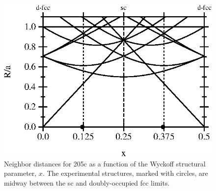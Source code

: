 \documentclass[preprint]{revtex4}              %
\begin{document}
\begin{figure}
\begin{center}
\includegraphics{205c.eps}
\end{center}
\caption[Neighbor distances for 205c as a function of $x$]{Neighbor
distances for 205c as a function of the Wyckoff structural
parameter, $x$.  The experimental structures, marked with circles,
are midway between the sc and doubly-occupied fcc limits.}
\label{fig:205c}
\end{figure}
\end{document}
